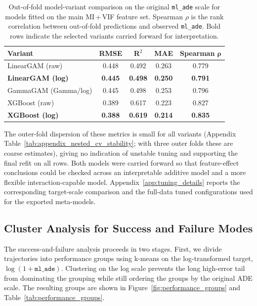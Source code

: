 \documentclass[12pt]{article}
\begin{document}
\begin{table}[H]
  \centering
  \caption[Out-of-fold model-variant comparison]{Out-of-fold model-variant comparison on the original \texttt{ml\_ade} scale for models fitted on the main MI\,+\,VIF feature set. Spearman $\rho$ is the rank correlation between out-of-fold predictions and observed \texttt{ml\_ade}. Bold rows indicate the selected variants carried forward for interpretation.}
  \label{tab:model_variant_selection}
  \begin{tabular}{lcccc}
    \toprule
    \textbf{Variant} & \textbf{RMSE} & \textbf{R$^2$} & \textbf{MAE} & \textbf{Spearman} $\boldsymbol{\rho}$ \\
    \midrule
    LinearGAM (raw) & 0.448 & 0.492 & 0.263 & 0.779 \\
    \textbf{LinearGAM (log)} & \textbf{0.445} & \textbf{0.498} & \textbf{0.250} & \textbf{0.791} \\
    GammaGAM (Gamma/log) & 0.445 & 0.498 & 0.253 & 0.796 \\
    XGBoost (raw) & 0.389 & 0.617 & 0.223 & 0.827 \\
    \textbf{XGBoost (log)} & \textbf{0.388} & \textbf{0.619} & \textbf{0.214} & \textbf{0.835} \\
    \bottomrule
  \end{tabular}
\end{table}

The outer-fold dispersion of these metrics is small for all variants (Appendix Table~\ref{tab:appendix_nested_cv_stability}; with three outer folds these are coarse estimates), giving no indication of unstable tuning and supporting the final refit on all rows. Both models were carried forward so that feature-effect conclusions could be checked across an interpretable additive model and a more flexible interaction-capable model. Appendix~\ref{app:tuning_details} reports the corresponding target-scale comparison and the full-data tuned configurations used for the exported meta-models.

\subsection{Cluster Analysis for Success and Failure Modes}
\label{sec:cluster_methodology}

The success-and-failure analysis proceeds in two stages. First, we divide trajectories into performance groups using k-means \citep{lloyd1982kmeans} on the log-transformed target, $\log(1+\texttt{ml\_ade})$. Clustering on the log scale prevents the long high-error tail from dominating the grouping while still ordering the groups by the original ADE scale. The resulting groups are shown in Figure~\ref{fig:performance_groups} and Table~\ref{tab:performance_groups}.
\end{document}
